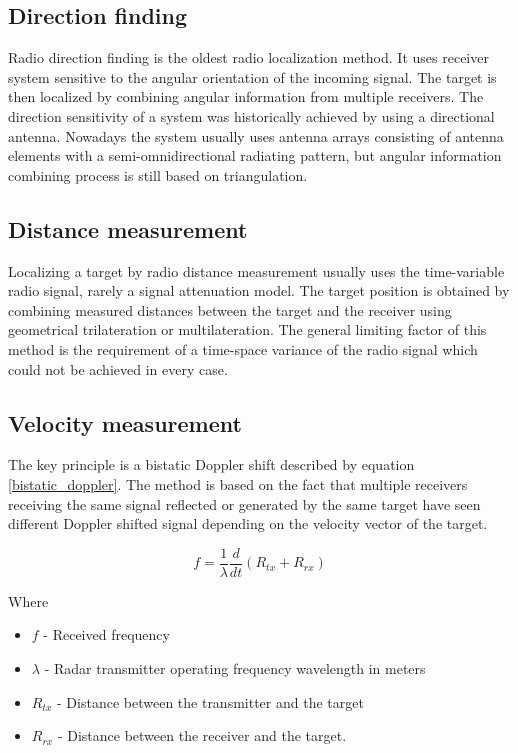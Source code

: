 \documentclass[twoside]{ctuthesis}
\theoremstyle{plain}
\theoremstyle{definition}
\theoremstyle{note}
\begin{document}
\subsection{Direction finding}

Radio direction finding is the oldest radio localization method.  It uses receiver system sensitive to the angular orientation of the incoming signal.  The target is then localized by combining angular information from multiple receivers.  The direction sensitivity of a system was historically achieved by using a directional antenna. Nowadays the system usually uses antenna arrays consisting of antenna elements with a semi-omnidirectional radiating pattern, but angular information combining process is still based on triangulation. 

\subsection{Distance measurement}
Localizing a target by radio distance measurement usually uses the time-variable radio signal, rarely a signal attenuation model.  The target position is obtained by combining measured distances between the target and the receiver using geometrical trilateration or multilateration. The general limiting factor of this method is the requirement of a time-space variance of the radio signal which could not be achieved in every case. 

\subsection{Velocity measurement}

The key principle is a bistatic Doppler shift described by equation \ref{bistatic_doppler}. The method is based on the fact that multiple receivers receiving the same signal reflected or generated by the same target have seen different Doppler shifted signal depending on the velocity vector of the target.  

\begin{equation}
f = \frac{1}{\lambda} \frac{d}{dt} \left( R_{tx} + R_{rx} \right)
\label{bistatic_doppler}
\end{equation}

Where 
\begin{itemize}
\item $f$ - Received frequency
\item $\lambda$ - Radar transmitter operating frequency wavelength in meters
\item $R_{tx}$ - Distance between the transmitter and the target
\item $R_{rx}$ - Distance between the receiver and the target.
\end{itemize}
\end{document}
